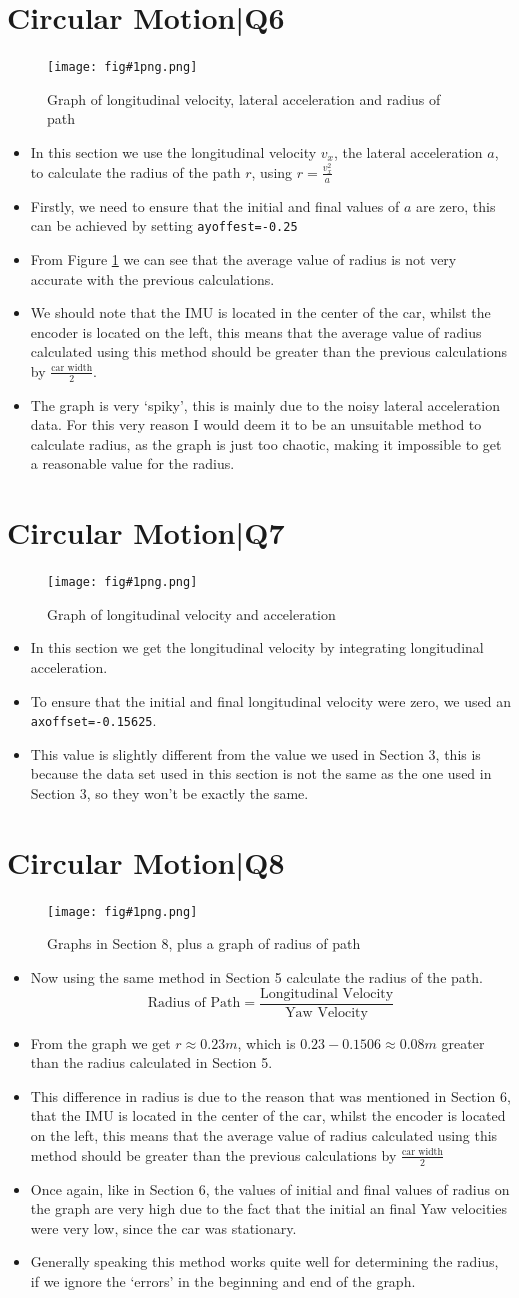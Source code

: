\documentclass{article}
\newcommand{\main}[4]{
    \section{#2}
    
    \begin{figure}[h]
        \begin{center}
        \texttt{[image: fig\#1png.png]} 
         \caption{#3}
        \label{fig:#1}      
        \end{center}
    
    \end{figure}
    
    #4
    \newpage
}
\newcommand{\bul}[1]{\begin{itemize}
    #1
\end{itemize}}
\begin{document}
\main{6}{Circular Motion|Q6}{Graph of longitudinal velocity, lateral acceleration and radius of path}{
\bul{
\item In this section we use the longitudinal velocity $v_x$, the lateral acceleration $a$, to calculate the radius of the path $r$, using $r=\frac{v_x^2}{a}$
\item Firstly, we need to ensure that the initial and final values of $a$ are zero, this can be achieved by setting \texttt{ayoffest=-0.25}
\item From Figure \ref{fig:6} we can see that the average value of radius is not very accurate with the previous calculations.  \item We should note that the IMU is located in the center of the car, whilst the encoder is located on the left, this means that the average value of radius calculated using this method should be greater than the previous calculations by $\frac{\textrm{car width}}{2}$. 

\item The graph is very `spiky', this is mainly due to the noisy lateral acceleration data. For this very reason I would deem it to be an unsuitable method to calculate radius, as the graph is just too chaotic, making it impossible to get a reasonable value for the radius.


}
}
\main{7}{Circular Motion|Q7}{Graph of longitudinal velocity and acceleration}{
\bul{
\item In this section we get the longitudinal velocity by integrating longitudinal acceleration.
\item To ensure that the initial and final longitudinal velocity were zero, we used an \texttt{axoffset=-0.15625}.\item This value is slightly different from the value we used in Section 3, this is because the data set used in this section is not the same as the one used in Section 3, so they won't be exactly the same.

}
}
\main{8}{Circular Motion|Q8}{Graphs in Section 8, plus a graph of radius of path}{
\bul{
\item Now using the same method in Section 5 calculate the radius of the path.$$\textrm{Radius of Path}=\frac{\textrm{Longitudinal Velocity}}{\textrm{Yaw Velocity}}$$
\item From the graph we get $r\approx0.23m$, which is $0.23-0.1506\approx 0.08m$ greater than the radius calculated in Section 5. \item This difference in radius is due to the reason that was mentioned in Section 6, that the IMU is located in the center of the car, whilst the encoder is located on the left, this means that the average value of radius calculated using this method should be greater than the previous calculations by $\frac{\textrm{car width}}{2}$
\item Once again, like in Section 6, the values of initial and final values of radius on the graph are very high due to the fact that the initial an final Yaw velocities were very low, since the car was stationary.
\item Generally speaking this method works quite well for determining the radius, if we ignore the `errors' in the beginning and end of the graph.

}
}
\end{document}
